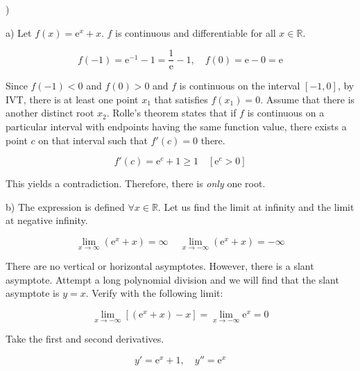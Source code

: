 \documentclass{article}
\begin{document}
)

\hfill

\noindent a) Let $f(x) = \mathrm{e}^x + x$. $f$ is continuous and differentiable for all $x\in\mathbb{R}$.

\begin{equation*}
    f(-1) = \mathrm{e}^{-1} -1 = \frac1{\mathrm{e}} - 1, \quad f(0) = \mathrm{e} - 0 = \mathrm{e}
\end{equation*}

\hfill

\noindent Since $f(-1) < 0$ and $f(0) > 0$ and $f$ is continuous on the interval $[-1, 0]$, by IVT, there is at least one point $x_1$ that satisfies $f(x_1) = 0$. Assume that there is another distinct root $x_2$. Rolle's theorem states that if $f$ is continuous on a particular interval with endpoints having the same function value, there exists a point $c$ on that interval such that $f'(c) = 0$ there.

\begin{equation*}
f'(c) = \mathrm{e}^c + 1 \geq 1 \quad [\mathrm{e}^c > 0]
\end{equation*}

\hfill

\noindent This yields a contradiction. Therefore, there is \textit{only} one root.

\hfill

\noindent b) The expression is defined $\forall x\in \mathbb{R}$. Let us find the limit at infinity and the limit at negative infinity.

\begin{equation*}\lim_{x\to \infty}(\mathrm{e}^x+x)=\infty\,\quad\lim_{x\to -\infty}(\mathrm{e}^x+x)=-\infty\end{equation*}

\hfill

\noindent There are no vertical or horizontal asymptotes. However, there is a slant asymptote. Attempt a long polynomial division and we will find that the slant asymptote is $y=x$. Verify with the following limit:

\begin{equation*}\lim_{x\to-\infty}\left[(\mathrm{e}^x+x)-x\right]=\lim_{x\to-\infty}\mathrm{e}^x=0\end{equation*}

\hfill 

\noindent Take the first and second derivatives.

\begin{equation*}y' = \mathrm{e}^x + 1,\quad y'' = \mathrm{e}^x\end{equation*}
\end{document}
